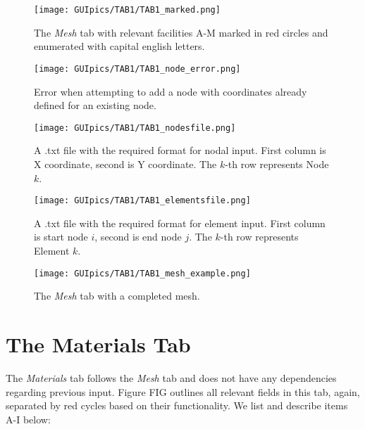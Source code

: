 \begin{appendices}
\begin{figure}
	\centering
	\texttt{[image: GUIpics/TAB1/TAB1\_marked.png]}
	\caption{The \textit{Mesh} tab with relevant facilities A-M marked in red 
		circles 
		and enumerated with capital english letters.}
	\label{fig:TAB1_marked}
\end{figure}

\begin{figure}
	\centering
	\texttt{[image: GUIpics/TAB1/TAB1\_node\_error.png]}
	\caption{Error when attempting to add a node with coordinates already 
		defined for an existing node.}
	\label{fig:TAB1_node_error}
\end{figure}

\begin{figure}
	\centering
	\texttt{[image: GUIpics/TAB1/TAB1\_nodesfile.png]}
	\caption{A .txt file with the required format for nodal input. First column 
		is X coordinate, second is Y coordinate. The $k$-th row represents Node 
		$k$.}
	\label{fig:TAB1_nodesfile}
\end{figure}
\begin{figure}
	\centering
	\texttt{[image: GUIpics/TAB1/TAB1\_elementsfile.png]}
	\caption{A .txt file with the required format for element input. First 
		column is start node $i$, second is end node $j$. The $k$-th row 
		represents 
		Element $k$.}
	\label{fig:TAB1_elementsfile}
\end{figure}

\begin{figure}
	\centering
	\texttt{[image: GUIpics/TAB1/TAB1\_mesh\_example.png]}
	\caption{The \textit{Mesh} tab with a completed mesh.}
	\label{fig:TAB1_mesh_example}
\end{figure}


\section*{The Materials Tab}

The \textit{Materials} tab follows the \textit{Mesh} tab and does not have any 
dependencies regarding previous input. Figure FIG outlines all relevant fields 
in this tab, again, separated by red cycles based on their functionality. We 
list and describe items A-I below:


\end{appendices}
